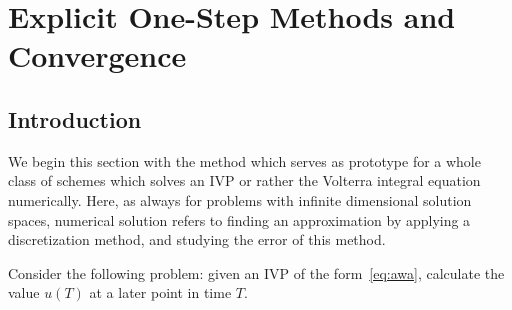 \chapter{Explicit One-Step Methods and Convergence}

\section{Introduction}
\begin{example}
  We begin this section with the method which serves as prototype for
  a whole class of schemes which solves an IVP or rather the Volterra
  integral equation numerically. Here, as always for problems with
  infinite dimensional solution spaces, numerical solution refers to
  finding an approximation by applying a discretization method, and
  studying the error of this method.
  
  Consider the following problem: given an IVP of the form~\eqref{eq:awa},
  calculate the value $u(T)$ at a later point in time $T$.
  

\end{example}
